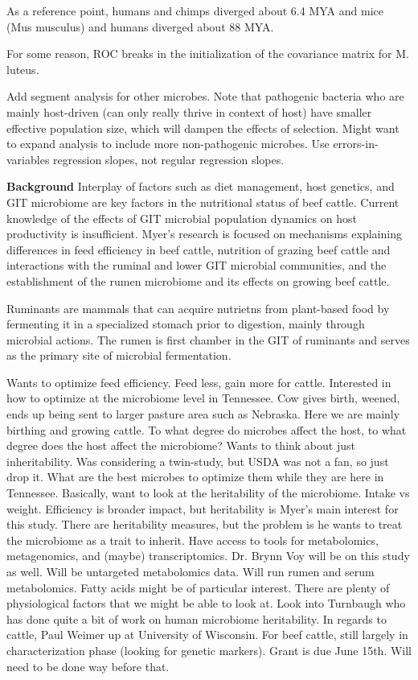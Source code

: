 \documentclass[11pt]{labbook}
\begin{document}
As a reference point, humans and chimps diverged about 6.4 MYA and mice (Mus musculus) and humans diverged about 88 MYA. 

For some reason, ROC breaks in the initialization of the covariance matrix for M. luteus. 


Add segment analysis for other microbes. Note that pathogenic bacteria who are mainly host-driven (can only really thrive in context of host) have smaller effective population size, which will dampen the effects of selection. Might want to expand analysis to include more non-pathogenic microbes. Use errors-in-variables regression slopes, not regular regression slopes.




\textbf{Background} Interplay of factors such as diet management, host genetics, and GIT microbiome are key factors in the nutritional status of beef cattle. Current knowledge of the effects of GIT microbial population dynamics on host productivity is insufficient. Myer's research is focused on mechanisms explaining differences in feed efficiency in beef cattle, nutrition of grazing beef cattle and interactions with the ruminal and lower GIT microbial communities, and the establishment of the rumen microbiome and its effects on growing beef cattle. 

Ruminants are mammals that can acquire nutrietns from plant-based food by fermenting it in a specialized stomach prior to digestion, mainly through microbial actions. The rumen is first chamber in the GIT of ruminants and serves as the primary site of microbial fermentation. 

Wants to optimize feed efficiency. Feed less, gain more for cattle. Interested in how to optimize at the microbiome level in Tennessee. Cow gives birth, weened, ends up being sent to larger pasture area such as Nebraska. Here we are mainly birthing and growing cattle. To what degree do microbes affect the host, to what degree does the host affect the microbiome? Wants to think about just inheritability. Was considering a twin-study, but USDA was not a fan, so just drop it. What are the best microbes to optimize them while they are here in Tennessee. Basically, want to look at the heritability of the microbiome. Intake vs weight. Efficiency is broader impact, but heritability is Myer's main interest for this study. There are heritability measures, but the problem is he wants to treat the microbiome as a trait to inherit. Have access to tools for metabolomics, metagenomics, and (maybe) transcriptomics. Dr. Brynn Voy will be on this study as well. Will be untargeted metabolomics data. Will run rumen and serum metabolomics. Fatty acids might be of particular interest. There are plenty of physiological factors that we might be able to look at. Look into Turnbaugh who has done quite a bit of work on human microbiome heritability. In regards to cattle, Paul Weimer up at University of Wisconsin. For beef cattle, still largely in characterization phase (looking for genetic markers). Grant is due June 15th. Will need to be done way before that. 
\end{document}
